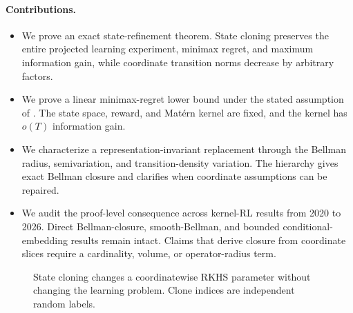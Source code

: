 \documentclass{article}
\newcommand{\Bpos}{\mathfrak B_{+}}
\newcommand{\Crkhs}{\mathfrak C}
\begin{document}
\paragraph{Contributions.}
\begin{itemize}[leftmargin=*,itemsep=2pt,topsep=2pt]
  \item We prove an exact state-refinement theorem. State cloning preserves the
entire projected learning experiment, minimax regret, and maximum information gain, while coordinate transition norms decrease by arbitrary factors.
  \item We prove a linear minimax-regret lower bound under the stated assumption of
\citet{vakili2024open}. The state space, reward, and Mat\'ern kernel are fixed, and the kernel has $o(T)$ information gain.
  \item We characterize a representation-invariant replacement through the Bellman
radius, semivariation, and transition-density variation. The hierarchy gives exact Bellman closure and clarifies when coordinate assumptions can be repaired.
  \item We audit the proof-level consequence across kernel-RL results from 2020 to
2026. Direct Bellman-closure, smooth-Bellman, and bounded conditional-embedding results remain intact. Claims that derive closure from coordinate slices require a cardinality, volume, or operator-radius term.
\end{itemize}

\begin{figure}[t]
\centering
{}
\caption{State cloning changes a coordinatewise RKHS parameter without changing
the learning problem. Clone indices are independent random labels.}
\label{fig:cloning}
\end{figure}
\end{document}
